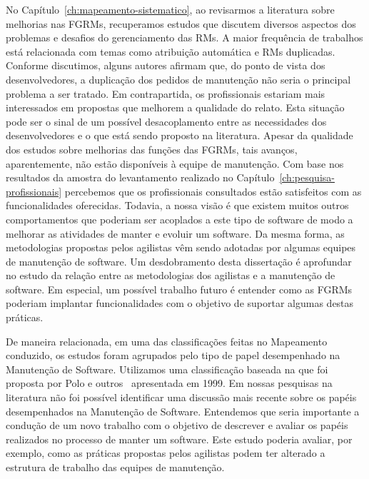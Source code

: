 No Capítulo~\ref{ch:mapeamento-sistematico}, ao revisarmos a literatura sobre
melhorias nas FGRMs, recuperamos estudos que discutem diversos aspectos dos
problemas e desafios do gerenciamento das RMs. A maior frequência de trabalhos
está relacionada com temas como atribuição automática e RMs duplicadas.
Conforme discutimos, alguns autores afirmam que, do ponto de vista dos
desenvolvedores, a duplicação dos pedidos de manutenção não seria o principal
problema a ser tratado. Em contrapartida, os profissionais estariam mais
interessados em propostas que melhorem a qualidade do relato. Esta situação
pode ser o sinal de um possível desacoplamento entre as necessidades dos
desenvolvedores e o que está sendo proposto na literatura. Apesar da qualidade
dos estudos sobre melhorias das funções das FGRMs, tais avanços, aparentemente,
não estão disponíveis à equipe de manutenção. Com base nos resultados da
amostra do levantamento realizado no Capítulo~\ref{ch:pesquisa-profissionais}
percebemos que os profissionais consultados estão satisfeitos com as
funcionalidades oferecidas. Todavia, a nossa visão é que existem muitos outros
comportamentos que poderiam ser acoplados a este tipo de software de modo a
melhorar as atividades de manter e evoluir um software. Da mesma forma, as
metodologias propostas pelos agilistas vêm sendo adotadas por algumas equipes
de manutenção de software. Um desdobramento desta dissertação é aprofundar no
estudo da relação entre as metodologias dos agilistas e a manutenção de
software. Em especial, um possível trabalho futuro é entender como as FGRMs
poderiam implantar funcionalidades com o objetivo de suportar algumas destas
práticas.

De maneira relacionada, em uma das classificações feitas no Mapeamento
conduzido, os estudos foram agrupados pelo tipo de papel desempenhado na
Manutenção de Software. Utilizamos uma classificação baseada na que foi
proposta por Polo e outros~\cite{Polo1999} apresentada em 1999. Em nossas
pesquisas na literatura não foi possível identificar uma discussão mais recente
sobre os papéis desempenhados na Manutenção de Software. Entendemos que seria
importante a condução de um novo trabalho com o objetivo de descrever e avaliar
os papéis realizados no processo de manter um software. Este estudo poderia
avaliar, por exemplo, como as práticas propostas pelos agilistas podem ter
alterado a estrutura de trabalho das equipes de manutenção.

